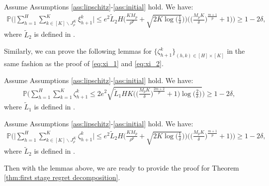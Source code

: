 \documentclass[final,supplement]{siamart251216}
\begin{document}
\begin{lemma}\label{lemma:xi absolute bound outside}
    Assume Assumptions \ref{ass:lipschitz}-\ref{ass:initial} hold. We have:
\begin{eqnarray*}
\mathbb{P}\Big( \Big|\sum_{h=1}^{H}\sum_{k\in [K]\backslash J_{\rho}^{K}}^{K}\xi_{h+1}^{k}\Big|\leq e^{2}\widetilde{L}_{2}H\Big(\frac{KM_{p}}{\rho^{p}}+\sqrt{2K\log(\frac{1}{\delta}})\Big)\Big(\Big(\frac{M_{p}K}{\delta}\Big)^{\frac{m+1}{p}} +1\Big)\Big)\geq 1-2\delta, 
\end{eqnarray*}
where $\widetilde{L}_{2}$ is defined in . 
\end{lemma}

Similarly, we can prove the following lemmas for $\{\zeta_{h+1}^{k}\}_{(h,k)\in [H]\times[K]}$ in the same fashion as the proof of \eqref{eq:xi_1} and \eqref{eq:xi_2}.

\begin{lemma}\label{lemma:zeta martingale bound}
Assume Assumptions \ref{ass:lipschitz}-\ref{ass:initial} hold. We have:
\begin{eqnarray*}
\mathbb{P}\Bigg(\sum_{h=1}^{H}\sum_{k=1}^{K}\zeta_{h+1}^{k}\leq 2e^{2}\sqrt{\widetilde{L}_{1}HK\Big(\Big(\frac{M_{p}K}{\delta}\Big)^{\frac{2m+2}{p}} +1\Big)\log\Big(\frac{2}{\delta}\Big)} \Bigg)\geq 1-2\delta, 
\end{eqnarray*}
where $\widetilde{L}_{1}$ is defined in . 
\end{lemma}

\begin{lemma}\label{lemma:zeta absolute bound outside}
    Assume Assumptions \ref{ass:lipschitz}-\ref{ass:initial} hold. We have:
\begin{eqnarray*}
\mathbb{P}\Big( \Big|\sum_{h=1}^{H}\sum_{k\in [K]\backslash J_{\rho}^{K}}^{K}\zeta_{h+1}^{k}\Big|\leq e^{2}\widetilde{L}_{2}H\Big(\frac{KM_{p}}{\rho^{p}}+\sqrt{2K\log(\frac{1}{\delta}})\Big)\Big(\Big(\frac{M_{p}K}{\delta}\Big)^{\frac{m+1}{p}} +1\Big)\Big)\geq 1-2\delta, 
\end{eqnarray*}
where $\widetilde{L}_{2}$ is defined in . 
\end{lemma}


Then with the lemmas above, we are ready to provide the proof for Theorem \ref{thm:first stage regret decomposition}.
\fi
\end{document}
